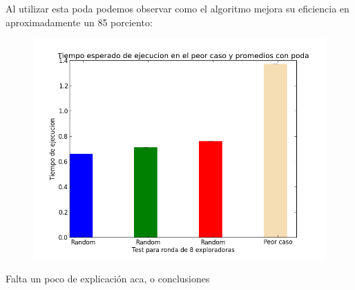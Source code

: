 \documentclass[11pt]{article}
\begin{document}
Al utilizar esta poda podemos observar como el algoritmo mejora su eficiencia en aproximadamente un 85 porciento: 

      \begin{figure}[h]
        \begin{center}
        \includegraphics[scale=0.4]{peorCaso8Conpoda}
        \end{center}
        \end{figure}


Falta un poco de explicación aca, o conclusiones
\end{document}
